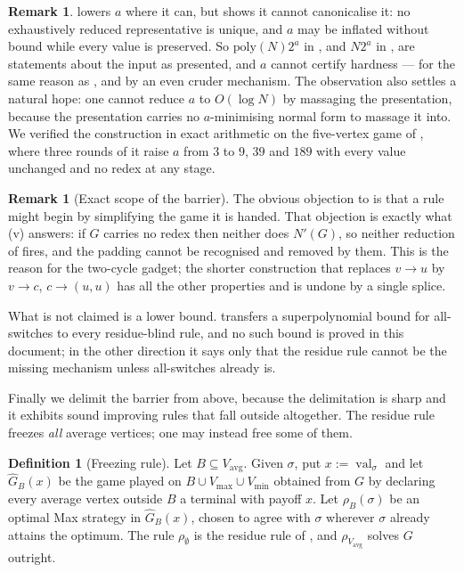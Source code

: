 \documentclass[11pt]{article}
\theoremstyle{plain}
\theoremstyle{definition}
\newtheorem{definition}[theorem]{Definition}
\newtheorem{remark}[theorem]{Remark}
\DeclareMathOperator{\val}{val}
\newcommand{\Vmax}{V_{\max}}
\newcommand{\Vmin}{V_{\min}}
\newcommand{\Vavg}{V_{\mathrm{avg}}}
\begin{document}
\begin{remark}\label{rem:parameter-presentation}
 lowers $a$ where it can, but 
shows it cannot canonicalise it: no exhaustively reduced representative
is unique, and $a$ may be inflated without bound while every value is
preserved. So $\mathrm{poly}(N)2^{a}$ in , and $N2^{a}$
in , are statements about the input as presented,
and $a$ cannot certify hardness --- for the same reason as
, and by an even cruder mechanism. The observation
also settles a natural hope: one cannot reduce $a$ to $O(\log N)$ by
massaging the presentation, because the presentation carries no
$a$-minimising normal form to massage it into. We verified the
construction in exact arithmetic on the five-vertex game of
, where three rounds of it raise $a$ from $3$
to $9$, $39$ and $189$ with every value unchanged and no redex at any
stage.
\end{remark}

\begin{remark}[Exact scope of the barrier]\label{rem:barrier-scope}
The obvious objection to  is that a rule
might begin by simplifying the game it is handed. That objection is
exactly what (v) answers: if $G$ carries no redex
then neither does $N'(G)$, so neither reduction of 
fires, and the padding cannot be recognised and removed by them. This is
the reason for the two-cycle gadget; the shorter construction that
replaces $v\to u$ by $v\to c$, $c\to(u,u)$ has all the other properties
and is undone by a single splice.

What is not claimed is a lower bound. 
transfers a superpolynomial bound for all-switches to every
residue-blind rule, and no such bound is proved in this document; in the
other direction it says only that the residue rule cannot be the missing
mechanism unless all-switches already is.
\end{remark}

Finally we delimit the barrier from above, because the delimitation is
sharp and it exhibits sound improving rules that fall outside
 altogether. The residue rule freezes \emph{all} average
vertices; one may instead free some of them.

\begin{definition}[Freezing rule]\label{def:freeze}
Let $B\subseteq\Vavg$. Given $\sigma$, put $x:=\val_\sigma$ and let
$\widehat G_B(x)$ be the game played on $B\cup\Vmax\cup\Vmin$ obtained
from $G$ by declaring every average vertex outside $B$ a terminal with
payoff $x$. Let $\rho_B(\sigma)$ be an optimal Max strategy in
$\widehat G_B(x)$, chosen to agree with $\sigma$ wherever $\sigma$
already attains the optimum. The rule $\rho_\emptyset$ is the residue
rule of , and $\rho_{\Vavg}$ solves $G$ outright.
\end{definition}
\end{document}
